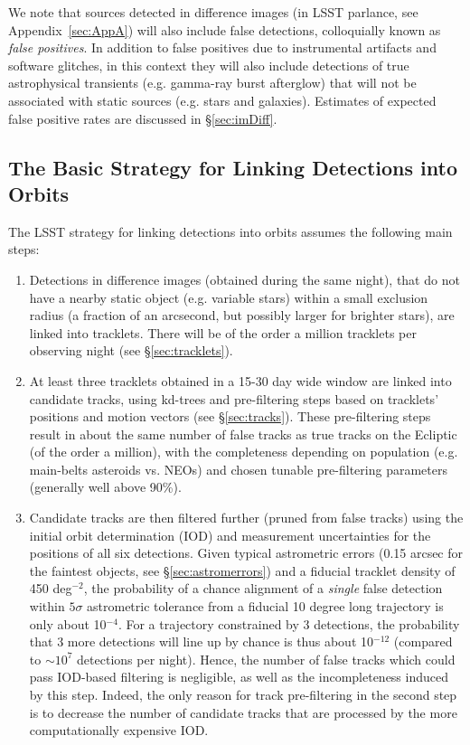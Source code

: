 We note that sources detected in difference images (\DIASources in LSST parlance, see Appendix~\ref{sec:AppA})
will also include false detections, colloquially known as {\it false positives}.
In addition to false positives due to instrumental artifacts and software glitches,
in this context they will also include detections of true astrophysical transients
(e.g. gamma-ray burst afterglow) that will not be associated with static sources
(e.g. stars and galaxies). Estimates of expected false positive rates are discussed
in \S\ref{sec:imDiff}.



\subsection{The Basic Strategy for Linking Detections into Orbits}

The LSST strategy for linking detections into orbits assumes the following main steps:
\begin{enumerate}
\item Detections in difference images (obtained during the same night), that do not
         have a nearby static object (e.g. variable stars) within a small exclusion radius
         (a fraction of an arcsecond, but possibly larger for brighter stars), are linked into tracklets. There will be of the order
         a million tracklets per observing night (see \S\ref{sec:tracklets}).
\item At least three tracklets obtained in a 15-30 day wide window are linked into
         candidate tracks, using kd-trees and pre-filtering steps based on tracklets' positions
         and motion vectors (see \S\ref{sec:tracks}). These pre-filtering steps result in
         about the same number of false tracks as true tracks on the Ecliptic (of the order
         a million), with the completeness depending on population (e.g. main-belts
         asteroids vs. NEOs) and chosen tunable pre-filtering parameters (generally well above 90\%).
\item Candidate tracks are then filtered further (pruned from false tracks) using the initial orbit
         determination (IOD) and measurement uncertainties for the positions of all six
         detections. Given typical astrometric errors (0.15 arcsec for the faintest objects,
         see \S\ref{sec:astromerrors})
         and a fiducial tracklet density of 450 deg$^{-2}$, the probability of a chance alignment
         of a {\it single} false detection within $5\sigma$ astrometric tolerance from a fiducial
         10 degree long trajectory is only about 10$^{-4}$. For a trajectory constrained by 3 detections, the
         probability that 3 more detections will line up by chance is thus about 10$^{-12}$ (compared to $\sim 10^7$ detections per night). Hence,
         the number of false tracks which could pass IOD-based filtering is negligible, as well as
         the incompleteness induced by this step. Indeed, the only reason for track pre-filtering
         in the second step is to decrease the number of candidate tracks that are processed
         by the more computationally expensive IOD.
\end{enumerate}

